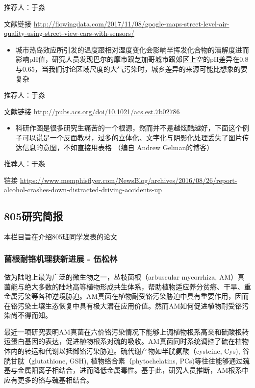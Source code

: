 \documentclass[]{book}
\providecommand{\tightlist}{%
  \setlength{\itemsep}{0pt}\setlength{\parskip}{0pt}}
\begin{document}
推荐人：于淼

文献链接
\url{http://flowingdata.com/2017/11/08/google-maps-street-level-air-quality-using-street-view-cars-with-sensors/}

\begin{itemize}
\tightlist
\item
  城市热岛效应所引发的温度跟相对湿度变化会影响半挥发化合物的溶解度进而影响pH值，研究人员发现巴尔的摩市跟芝加哥城市跟郊区上空的pH差异在0.8与0.65，当我们讨论区域尺度的大气污染时，城乡差异的来源可能比想象的要复杂
\end{itemize}

推荐人：于淼

文献链接 \url{http://pubs.acs.org/doi/10.1021/acs.est.7b02786}

\begin{itemize}
\tightlist
\item
  科研作图是很多研究生痛苦的一个根源，然而并不是越炫酷越好，下面这个例子可以说是一个反面教材，过多的立体化、文字化与阴影化处理丢失了图片传达信息的意图，不如直接用表格
  （编自 Andrew Gelman的博客）
\end{itemize}

推荐人：于淼

链接
\url{https://www.memphisflyer.com/NewsBlog/archives/2016/08/26/report-alcohol-crashes-down-distracted-driving-accidents-up}

\subsection*{805研究简报}

本栏目旨在介绍805班同学发表的论文

\subsubsection*{菌根耐铬机理获新进展 - 伍松林}\label{---}

做为陆地上最为广泛的微生物之一，丛枝菌根（arbuscular mycorrhiza,
AM）真菌能与绝大多数的陆地高等植物形成共生体系，帮助植物适应养分贫瘠、干旱、重金属污染等各种逆境胁迫。AM真菌在植物耐受铬污染胁迫中具有重要作用，因而在铬污染土壤生态恢复中具有极大潜在应用价值。然而AM如何促进植物耐受铬污染尚不得而知。

最近一项研究表明AM真菌在六价铬污染情况下能够上调植物根系高亲和硫酸根转运蛋白基因的表达，促进植物根系对硫的吸收。AM真菌同时系统调控了硫在植物体内的转运和代谢以抵御铬污染胁迫。硫代谢产物如半胱氨酸（cysteine,
Cys), 谷胱甘肽（glutathione, GSH), 植物络合素（phytochelatins,
PCs)等往往能够通过巯基与金属阳离子相结合，进而降低金属毒性。基于此，研究人员推断，AM根系中应有更多的铬与巯基相结合。
\end{document}
